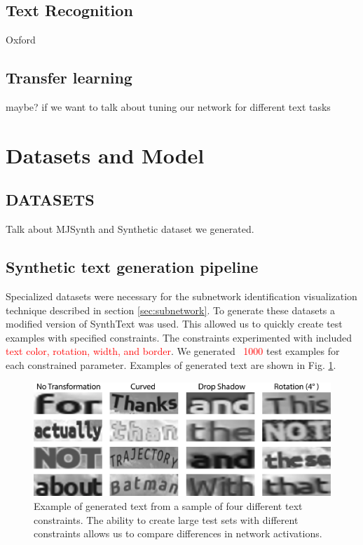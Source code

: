 \documentclass[10pt,twocolumn,letterpaper]{article}
\begin{document}
\subsection{Text Recognition}

Oxford

\subsection{Transfer learning}

maybe? if we want to talk about tuning our network for different text tasks

\section{Datasets and Model}
\subsection{DATASETS}
Talk about MJSynth and Synthetic dataset we generated. 

\subsection{Synthetic text generation pipeline} \label{sec:synthtext}
Specialized datasets were necessary for the subnetwork identification visualization technique described in section \ref{sec:subnetwork}.
To generate these datasets a modified version of SynthText \cite{Gupta16} was used. This allowed us to quickly create test examples with specified constraints. The constraints experimented with included \textcolor{red}{text color, rotation, width, and border}. We generated \textcolor{red}{~1000} test examples for each constrained parameter. Examples of generated text are shown in Fig. \ref{fig:genText}.

\begin{figure}
\includegraphics[width=\columnwidth]{Figures/synthtext_outputs/synthext_outputs.png}
\caption{Example of generated text from a sample of four different text constraints. The ability to create large test sets with different constraints allows us to compare differences in network activations.}
\label{fig:genText}
\end{figure}
\end{document}
